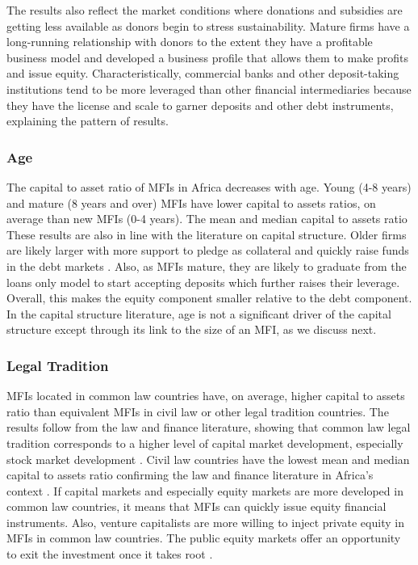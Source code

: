 \documentclass[a4paper, nobind]{templates/ociamthesis}
\begin{document}
The results also reflect the market conditions where donations and subsidies are getting less available as donors begin to stress sustainability. Mature firms have a long-running relationship with donors to the extent they have a profitable business model and developed a business profile that allows them to make profits and issue equity. Characteristically, commercial banks and other deposit-taking institutions tend to be more leveraged than other financial intermediaries because they have the license and scale to garner deposits and other debt instruments, explaining the pattern of results.

\hypertarget{age-2}{%
\subsubsection{Age}\label{age-2}}

The capital to asset ratio of MFIs in Africa decreases with age. Young (4-8 years) and mature (8 years and over) MFIs have lower capital to assets ratios, on average than new MFIs (0-4 years). The mean and median capital to assets ratio These results are also in line with the literature on capital structure. Older firms are likely larger with more support to pledge as collateral and quickly raise funds in the debt markets \autocite{barclay2005capital}. Also, as MFIs mature, they are likely to graduate from the loans only model to start accepting deposits which further raises their leverage. Overall, this makes the equity component smaller relative to the debt component. In the capital structure literature, age is not a significant driver of the capital structure except through its link to the size of an MFI, as we discuss next.

\hypertarget{legal-tradition-1}{%
\subsubsection{Legal Tradition}\label{legal-tradition-1}}

MFIs located in common law countries have, on average, higher capital to assets ratio than equivalent MFIs in civil law or other legal tradition countries. The results follow from the law and finance literature, showing that common law legal tradition corresponds to a higher level of capital market development, especially stock market development \autocite{la2013law}. Civil law countries have the lowest mean and median capital to assets ratio confirming the law and finance literature in Africa's context \autocite{schnyder2018twenty}. If capital markets and especially equity markets are more developed in common law countries, it means that MFIs can quickly issue equity financial instruments. Also, venture capitalists are more willing to inject private equity in MFIs in common law countries. The public equity markets offer an opportunity to exit the investment once it takes root \autocite{kent2013bankers}.
\end{document}
